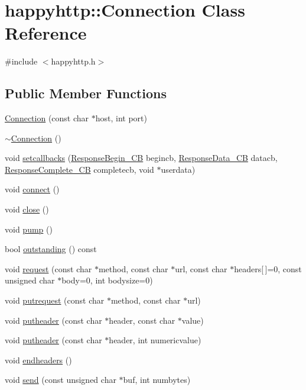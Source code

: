 \hypertarget{classhappyhttp_1_1_connection}{}\section{happyhttp\+:\+:Connection Class Reference}
\label{classhappyhttp_1_1_connection}


{\ttfamily \#include $<$happyhttp.\+h$>$}

\subsection*{Public Member Functions}
\begin{DoxyCompactItemize}
\item 
\hyperlink{classhappyhttp_1_1_connection_aba4b4a5cd535d1e09259d44c3c13ac0a}{Connection} (const char $\ast$host, int port)
\item 
\hyperlink{classhappyhttp_1_1_connection_acdacbc124c828196ea9e3d40893cf73b}{$\sim$\+Connection} ()
\item 
void \hyperlink{classhappyhttp_1_1_connection_ac83d106dde87088f90fa2eff188a717e}{setcallbacks} (\hyperlink{namespacehappyhttp_a1997a4fe11e48d3b2b6bedbb246e8975}{Response\+Begin\+\_\+\+CB} begincb, \hyperlink{namespacehappyhttp_a818d88091992f5d95f2c53708511fd49}{Response\+Data\+\_\+\+CB} datacb, \hyperlink{namespacehappyhttp_ae70d6705a8684783ce996b296e181ede}{Response\+Complete\+\_\+\+CB} completecb, void $\ast$userdata)
\item 
void \hyperlink{classhappyhttp_1_1_connection_a15e00ce5d2a78e367c21a329c3b2dc92}{connect} ()
\item 
void \hyperlink{classhappyhttp_1_1_connection_ad374f95fd6167a12c54a8e6e8ec41ba4}{close} ()
\item 
void \hyperlink{classhappyhttp_1_1_connection_abd1931461220122e66bfa417dd6b2ac9}{pump} ()
\item 
bool \hyperlink{classhappyhttp_1_1_connection_adb8395afee31fcf164c8a2dca06e2bd8}{outstanding} () const 
\item 
void \hyperlink{classhappyhttp_1_1_connection_a5e357cb980f080fa60f7419c63794c50}{request} (const char $\ast$method, const char $\ast$url, const char $\ast$headers\mbox{[}$\,$\mbox{]}=0, const unsigned char $\ast$body=0, int bodysize=0)
\item 
void \hyperlink{classhappyhttp_1_1_connection_aeca12cf6cc5c7d30da2885dd4df825a1}{putrequest} (const char $\ast$method, const char $\ast$url)
\item 
void \hyperlink{classhappyhttp_1_1_connection_aa3dec53a9703d15b9cde72344b197d5a}{putheader} (const char $\ast$header, const char $\ast$value)
\item 
void \hyperlink{classhappyhttp_1_1_connection_aeddb5ae0ac0ec82505363c2e5a0b78c1}{putheader} (const char $\ast$header, int numericvalue)
\item 
void \hyperlink{classhappyhttp_1_1_connection_a5ed609b16e685c325a1ecfa9afd7f98b}{endheaders} ()
\item 
void \hyperlink{classhappyhttp_1_1_connection_ad2838bb18ed0679ec2dfec79cc65d8e5}{send} (const unsigned char $\ast$buf, int numbytes)
\end{DoxyCompactItemize}

